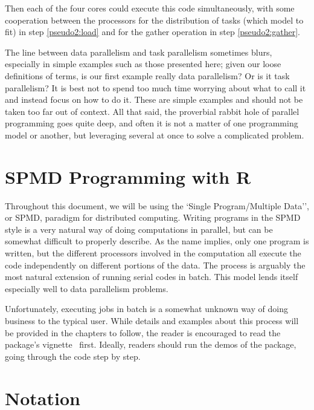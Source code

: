 Then each of the four cores could execute this code simultaneously, with some
cooperation between the processors for the distribution of tasks (which model
to fit) in step \ref{pseudo2:load} and for the gather operation in
step \ref{pseudo2:gather}.


The line between data parallelism and task parallelism sometimes blurs,
especially in simple examples such as those presented here; given our loose
definitions of terms, is our first example really data parallelism?  Or is
it task parallelism?  It is best not to spend too much time worrying about
what to call it and instead focus on how to do it. These are simple examples
and should not be taken too far out of context. All that said, the proverbial
rabbit hole of parallel programming goes quite deep, and often it is not a
matter of one programming model or another, but leveraging several at once
to solve a complicated problem.





\section{SPMD Programming with R}

Throughout this document, we will be using the `Single Program/Multiple Data'',
or SPMD, paradigm for distributed computing.
Writing programs in the SPMD style is a very natural way of doing
computations in parallel, but can be somewhat difficult to properly describe.
As the name implies, only one program is written, but the different processors
involved in the computation all execute the code independently on different
portions of the data. The process is arguably the most natural extension of
running serial codes in batch. This model lends itself especially well to
data parallelism problems.

Unfortunately, executing jobs in batch is a somewhat unknown way of doing
business to the typical  user. While details and examples about
this process will be provided in the chapters to follow, the reader is
encouraged to read the  package's
vignette~\citep{Chen2012pbdMPIvignette} first.  Ideally, readers should
run the demos of the  package, going through the code step by step.




\section{Notation}
\label{sec:notation}

